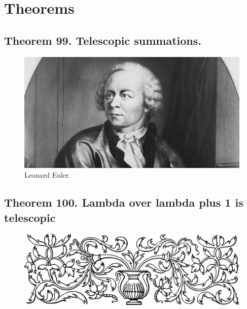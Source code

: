 \documentclass[preview]{standalone}
\begin{document}
\section{Theorems}


\subsection[Telescopic summations.]{
    \color{section} Theorem 99. \color{black} Telescopic summations.
    }

\pagebreak


\begin{figure}[!h]
    \centering
    \includegraphics[width=14cm]{../resources/jpg/2.4.sequences.and.summations/euler.jpg}
    \caption*{Leonard Euler.}
\end{figure}    
\subsection[Lambda divided by lambda plus one is telescopic.]{
    \color{section} Theorem 100. \color{black} Lambda over lambda plus 1 is telescopic
}
\vspace{-0.8cm}

\pagebreak


\begin{figure}[!h]
    \centering
    \includegraphics[width=14cm]{../resources/jpg/2.4.sequences.and.summations/border1.png}
\end{figure}
\end{document}
